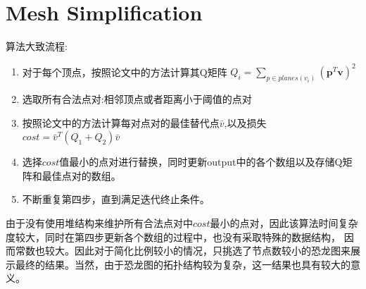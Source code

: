 \documentclass[12pt, a4paper]{ctexart}
\begin{document}
\section{Mesh Simplification}
算法大致流程:

\begin{enumerate}
    \item 对于每个顶点，按照论文中的方法计算其Q矩阵 $Q_{i} = \sum_{p \in planes(v_{i})} (\textbf{p} ^T \textbf{v}) ^2 $
    \item 选取所有合法点对:相邻顶点或者距离小于阈值的点对
    \item 按照论文中的方法计算每对点对的最佳替代点$\bar{v}$,以及损失$cost = \bar{v} ^T (Q_{1}+Q_{2})\bar{v}$
    \item 选择$cost$值最小的点对进行替换，同时更新output中的各个数组以及存储Q矩阵和最佳点对的数组。
    \item 不断重复第四步，直到满足迭代终止条件。
\end{enumerate}

由于没有使用堆结构来维护所有合法点对中$cost$最小的点对，因此该算法时间复杂度较大，同时在第四步更新各个数组的过程中，也没有采取特殊的数据结构，
因而常数也较大。因此对于简化比例较小的情况，只挑选了节点数较小的恐龙图来展示最终的结果。当然，由于恐龙图的拓扑结构较为复杂，这一结果也具有较大的意义。
\end{document}

